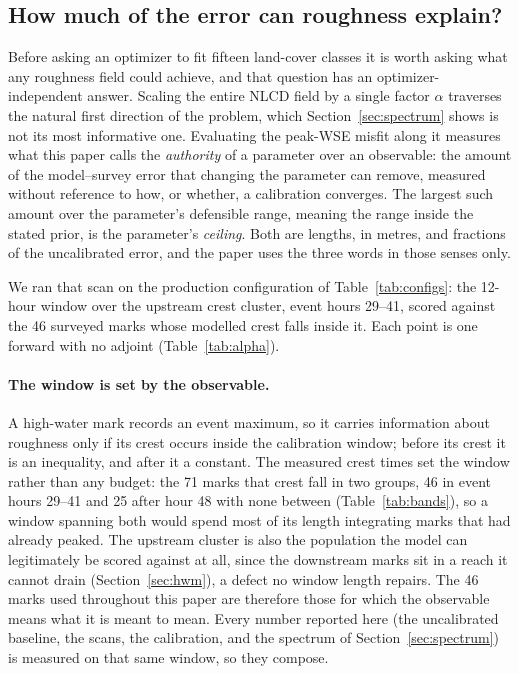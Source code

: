 \documentclass[11pt]{article}
\begin{document}
\subsection{How much of the error can roughness explain?}
\label{sec:authority}

Before asking an optimizer to fit fifteen land-cover classes it is
worth asking what any roughness field could achieve, and that question
has an optimizer-independent answer. Scaling the entire NLCD field by
a single factor $\alpha$ traverses the natural first direction of the
problem, which Section~\ref{sec:spectrum} shows is not its most
informative one. Evaluating the peak-WSE misfit
along it measures what this paper calls the \emph{authority} of a
parameter over an observable: the amount of the model--survey error
that changing the parameter can remove, measured without reference to
how, or whether, a calibration converges. The largest such amount over
the parameter's defensible range, meaning the range inside the stated
prior, is the parameter's \emph{ceiling}. Both are lengths, in metres,
and fractions of the uncalibrated error, and the paper uses the three
words in those senses only.

We ran that scan on the production configuration of
Table~\ref{tab:configs}: the 12-hour window over the upstream crest
cluster, event hours 29--41, scored against the 46 surveyed marks whose
modelled crest falls inside it. Each point is one forward with no
adjoint (Table~\ref{tab:alpha}).

\paragraph{The window is set by the observable.}
A high-water mark records an event maximum, so it carries information
about roughness only if its crest occurs inside the calibration window;
before its crest it is an inequality, and after it a constant. The
measured crest times set the window rather than any budget: the 71
marks that crest fall in two groups, 46 in event hours 29--41 and 25
after hour 48 with none between (Table~\ref{tab:bands}), so a window
spanning both would spend most of its length integrating marks that
had already peaked. The upstream cluster is also
the population the model can legitimately be scored against at all,
since the downstream marks sit in a reach it cannot drain
(Section~\ref{sec:hwm}), a defect no window length repairs. The 46
marks used throughout this paper are therefore those for which the
observable means what it is meant to mean. Every number reported here
(the uncalibrated baseline, the scans, the calibration, and the
spectrum of Section~\ref{sec:spectrum}) is measured on that same
window, so they compose.
\end{document}
